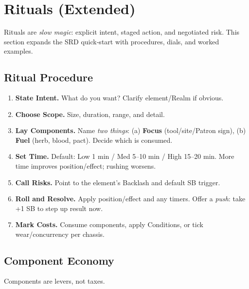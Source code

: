 \section{Rituals (Extended)}\label{sec:rituals_extended}

Rituals are \emph{slow magic}: explicit intent, staged action, and negotiated risk. This section expands the SRD quick‑start with procedures, dials, and worked examples.

\subsection{Ritual Procedure}\label{subsec:ritual_procedure}
\begin{enumerate}[label=\textbf{Step \arabic*:}, leftmargin=2.2em]
    \item \textbf{State Intent.} What do you want? Clarify element/Realm if obvious.
    \item \textbf{Choose Scope.} Size, duration, range, and detail.
    \item \textbf{Lay Components.} Name \emph{two things}: (a) \textbf{Focus} (tool/site/Patron sign), (b) \textbf{Fuel} (herb, blood, pact). Decide which is consumed.
    \item \textbf{Set Time.} Default: Low 1 min / Med 5--10 min / High 15--20 min. More time improves position/effect; rushing worsens.
    \item \textbf{Call Risks.} Point to the element's Backlash and default SB trigger.
    \item \textbf{Roll and Resolve.} Apply position/effect and any timers. Offer a \emph{push}: take +1 SB to step up result now.
    \item \textbf{Mark Costs.} Consume components, apply Conditions, or tick wear/concurrency per chassis.
\end{enumerate}

\subsection{Component Economy}\label{subsec:component_economy}

Components are levers, not taxes.

